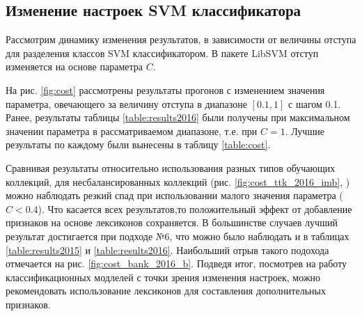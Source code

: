 \subsection{Изменение настроек SVM классификатора}
Рассмотрим динамику изменения результатов, в зависимости от величины
отступа для разделения классов SVM классификатором.
В пакете LibSVM отступ изменяется на основе параметра $C$.

На рис. \ref{fig:cost} рассмотрены результаты прогонов с
изменением значения параметра, овечающего за величину отступа в диапазоне
$[0.1, 1]$ с шагом 0.1. Ранее, результаты таблицы \ref{table:results2016}
были получены при максимальном значении параметра в рассматриваемом диапазоне,
т.е. при $C= 1$.
Лучшие результаты по каждому были вынесены в таблицу \ref{table:cost}.


Сравнивая результаты относительно использования разных типов обучающих коллекций,
для несбалансированных коллекций (рис. \ref{fig:cost_ttk_2016_imb},
\label{fig:cost_bank_2016_imb})
можно наблюдать резкий спад при использовании малого значения параметра ($C < 0.4$).
Что касается всех результатов,то положительный эффект от добавление признаков
на основе лексиконов сохраняется.
В большинстве случаев лучший результат достигается при подходе №6, что
можно было наблюдать и в таблицах \ref{table:results2015} и \ref{table:results2016}.
Наибольший отрыв такого подохода отмечается на рис. \ref{fig:cost_bank_2016_b}.
Подведя итог, посмотрев на работу классификационных модлелей с точки зрения
изменения настроек, можно рекомендовать использование лексиконов для составления
дополнительных признаков.


